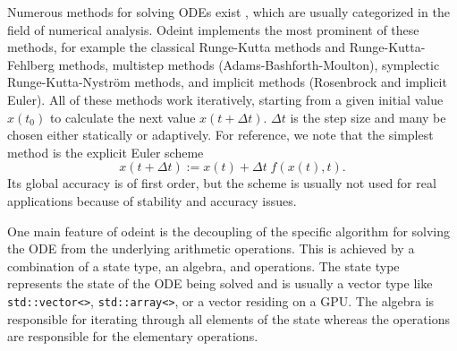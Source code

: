 \documentclass[final]{siamltex}
\newcommand{\code}[1]{\lstinline|#1|}
\begin{document}
Numerous methods for solving ODEs exist \cite{Press-92,HairerSolvingODEI,
  HairerSolvingODEII}, %
which are usually categorized in the field of numerical analysis.
Odeint
implements the most prominent of these methods, for example the
classical Runge-Kutta methods and Runge-Kutta-Fehlberg methods,
multistep methods (Adams-Bashforth-Moulton), symplectic
Runge-Kutta-Nystr\"om methods, and implicit methods (Rosenbrock and
implicit Euler). All of these methods work iteratively, starting
from a given initial value $x(t_0)$ to calculate the next value
$x(t+\Delta t)$.
$\Delta t$ is the step size and many be chosen either statically or adaptively.
For reference, we note that the simplest method is the explicit Euler scheme
\begin{equation}
x\left(t+\Delta t\right) := x(t) + \Delta t \; f(x(t),t) .
\label{eq:euler}
\end{equation}
Its global accuracy is of first order, but the scheme is usually not
used for real applications because of stability and accuracy issues.


One main feature of odeint is the decoupling of the specific algorithm
for solving the ODE from the underlying arithmetic operations. This
is achieved by a combination of a state type, an algebra, and
operations. The state type represents the state of the ODE being
solved and is usually a vector type like \code{std::vector<>},
\code{std::array<>}, or a vector residing on a GPU. The algebra is
responsible for iterating through all elements of the state whereas
the operations are responsible for the elementary operations.
\end{document}
